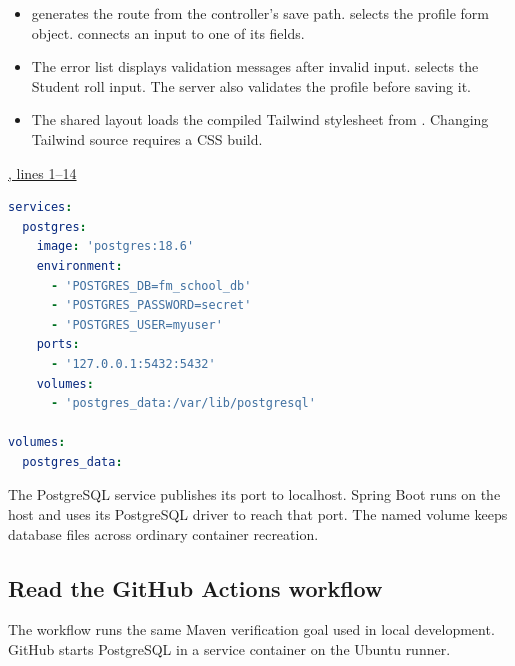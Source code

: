 \begin{itemize}
\item {} generates the route from the controller's save path.
 selects the profile form object.  connects an
input to one of its fields.
\item The error list displays validation messages after invalid input.
 selects the Student roll input. The server also validates the
profile before saving it.
\item The shared layout loads the compiled Tailwind stylesheet from
. Changing Tailwind source requires a CSS build.
\end{itemize}

\par\smallskip
{\small\href{\repo/blob/5d22aed7f6d4ef1e4c0b0c0dabf2962ba4b47608/compose.yaml#L1-L14}{, lines 1--14}}
\begin{lstlisting}[style=source,language=YAML,firstnumber=1]
services:
  postgres:
    image: 'postgres:18.6'
    environment:
      - 'POSTGRES_DB=fm_school_db'
      - 'POSTGRES_PASSWORD=secret'
      - 'POSTGRES_USER=myuser'
    ports:
      - '127.0.0.1:5432:5432'
    volumes:
      - 'postgres_data:/var/lib/postgresql'

volumes:
  postgres_data:
\end{lstlisting}


The PostgreSQL service publishes its port to localhost. Spring Boot runs on the
host and uses its PostgreSQL driver to reach that port. The named volume keeps
database files across ordinary container recreation.

\clearpage
\subsection{Read the GitHub Actions workflow}
The workflow runs the same Maven verification goal used in local development.
GitHub starts PostgreSQL in a service container on the Ubuntu runner.


